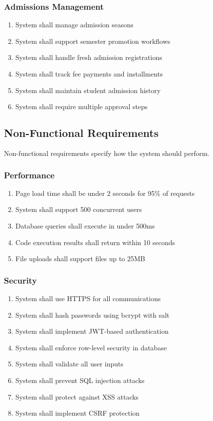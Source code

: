 \subsubsection{Admissions Management}
\begin{enumerate}[label=FR-ADM-\arabic*]
\item System shall manage admission seasons
\item System shall support semester promotion workflows
\item System shall handle fresh admission registrations
\item System shall track fee payments and installments
\item System shall maintain student admission history
\item System shall require multiple approval steps
\end{enumerate}

\subsection{Non-Functional Requirements}

Non-functional requirements specify how the system should perform.

\subsubsection{Performance}
\begin{enumerate}[label=NFR-PERF-\arabic*]
\item Page load time shall be under 2 seconds for 95\% of requests
\item System shall support 500 concurrent users
\item Database queries shall execute in under 500ms
\item Code execution results shall return within 10 seconds
\item File uploads shall support files up to 25MB
\end{enumerate}

\subsubsection{Security}
\begin{enumerate}[label=NFR-SEC-\arabic*]
\item System shall use HTTPS for all communications
\item System shall hash passwords using bcrypt with salt
\item System shall implement JWT-based authentication
\item System shall enforce row-level security in database
\item System shall validate all user inputs
\item System shall prevent SQL injection attacks
\item System shall protect against XSS attacks
\item System shall implement CSRF protection
\end{enumerate}

